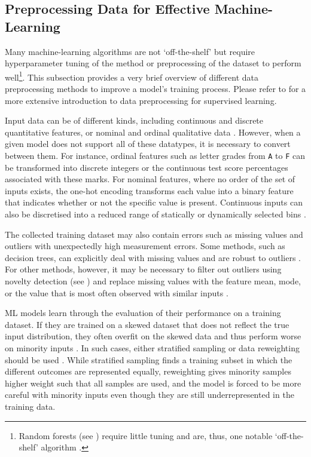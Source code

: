 \subsection{Preprocessing Data for Effective Machine-Learning} \label{txt:data-preprocessing}

Many machine-learning algorithms are not `off-the-shelf' but require hyperparameter tuning of the method or preprocessing of the dataset \cite{statistical-learning-2009} to perform well\footnote{Random forests (see ) require little tuning and are, thus, one notable `off-the-shelf' algorithm \cite{statistical-learning-2009, ml-hyperparameters-2021}.}. This subsection provides a very brief overview of different data preprocessing methods to improve a model's training process. Please refer to \textcite{data-preprocessing-2007} for a more extensive introduction to data preprocessing for supervised learning.

\newpar Input data can be of different kinds, including continuous and discrete quantitative features, or nominal and ordinal qualitative data \cite{feature-selection-2014}. However, when a given model does not support all of these datatypes, it is necessary to convert between them. For instance, ordinal features such as letter grades from \texttt{A} to \texttt{F} can be transformed into discrete integers or the continuous test score percentages associated with these marks. For nominal features, where no order of the set of inputs exists, the one-hot encoding transforms each value into a binary feature that indicates whether or not the specific value is present. Continuous inputs can also be discretised into a reduced range of statically or dynamically selected bins \cite{data-preprocessing-2007}.

The collected training dataset may also contain errors such as missing values and outliers with unexpectedly high measurement errors. Some methods, such as decision trees, can explicitly deal with missing values \cite{machine-learning-1997} and are robust to outliers \cite{statistical-learning-2009}. For other methods, however, it may be necessary to filter out outliers using novelty detection (see ) and replace missing values with the feature mean, mode, or the value that is most often observed with similar inputs \cite{data-preprocessing-2007}.

ML models learn through the evaluation of their performance on a training dataset. If they are trained on a skewed dataset that does not reflect the true input distribution, they often overfit on the skewed data and thus perform worse on minority inputs \cite{ml-bias-discrimination-2017}. In such cases, either stratified sampling or data reweighting should be used \cite{data-preprocessing-2007}. While stratified sampling finds a training subset in which the different outcomes are represented equally, reweighting gives minority samples higher weight such that all samples are used, and the model is forced to be more careful with minority inputs even though they are still underrepresented in the training data.

